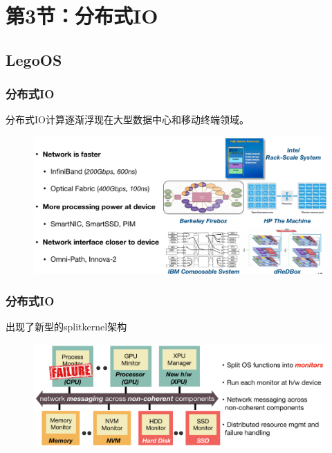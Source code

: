 \section{第3节：分布式IO} %
\subsection{LegoOS} %
\begin{frame}[fragile]
    \frametitle{分布式IO}
    分布式IO计算逐渐浮现在大型数据中心和移动终端领域。
  
   
    
        \begin{figure}
        \includegraphics[width=0.9\linewidth]{figs/disio-current.png}
        \end{figure}
\end{frame}

\begin{frame}[fragile]
    \frametitle{分布式IO}
    出现了新型的splitkernel架构
    
    
    
    \begin{figure}
        \includegraphics[width=0.9\linewidth]{figs/disio-splitkernel.png}
    \end{figure}
\end{frame}

